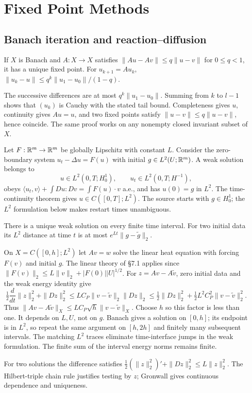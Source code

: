 \section{Fixed Point Methods}
\label{sec:9-2}
\Needspace{40mm}
\subsection{Banach iteration and reaction--diffusion}
\Needspace{50mm}
\begin{theorem}
If $X$ is Banach and $A:X\to X$ satisfies
$\|Au-Av\|\leq q\|u-v\|$ for $0\leq q<1$, it has a unique fixed point.
For $u_{k+1}=Au_k$,
$\|u_k-u\|\leq q^k\|u_1-u_0\|/(1-q)$.
\end{theorem}
\begin{expandedproof}
The successive differences are at most $q^k\|u_1-u_0\|$. Summing from
$k$ to $l-1$ shows that $(u_k)$ is Cauchy with the stated tail bound.
Completeness gives $u$, continuity gives $Au=u$, and two fixed points
satisfy $\|u-v\|\leq q\|u-v\|$, hence coincide.
The same proof works on any nonempty closed invariant subset of $X$.
\end{expandedproof}
Let $F:\mathbb{R}^m\to\mathbb{R}^m$ be globally Lipschitz with constant $L$.
Consider the zero-boundary system $u_t-\Delta u=F(u)$ with initial
$g\in L^2(U;\mathbb{R}^m)$. A weak solution belongs to
\[
 u\in L^2(0,T;H^1_0),\qquad u_t\in L^2(0,T;H^{-1}),
\]
obeys $\langle u_t,v\rangle+\int Du:Dv=\int F(u)\cdot v$ a.e.,
and has $u(0)=g$ in $L^2$. The time-continuity theorem gives
$u\in C([0,T];L^2)$. The source starts with $g\in H^1_0$;
the $L^2$ formulation below makes restart times unambiguous.
\Needspace{50mm}
\begin{theorem}
There is a unique weak solution on every finite time interval. For two
initial data its $L^2$ distance at time $t$ is at most
$e^{Lt}\|g-\tilde g\|_2$.
\end{theorem}
\begin{expandedproof}
On $X=C([0,h];L^2)$ let $Av=w$ solve the linear heat equation with
forcing $F(v)$ and initial $g$. The linear theory of \S7.1 applies since
$\|F(v)\|_2\leq L\|v\|_2+|F(0)||U|^{1/2}$.
For $z=Av-A\tilde v$, zero initial data and the weak energy identity give
\[
 \tfrac12\frac d{dt}\|z\|_2^2+\|Dz\|_2^2
 \leq L C_P\|v-\tilde v\|_2\|Dz\|_2
 \leq\tfrac12\|Dz\|_2^2+\tfrac12 L^2C_P^2\|v-\tilde v\|_2^2.
\]
Thus $\|Av-A\tilde v\|_X\leq LC_P\sqrt h\|v-\tilde v\|_X$.
Choose $h$ so this factor is less than one. It depends on $L,U$, not on
$g$. Banach gives a solution on $[0,h]$; its endpoint is in $L^2$, so
repeat the same argument on $[h,2h]$ and finitely many subsequent intervals.
The matching $L^2$ traces eliminate time-interface jumps in the weak
formulation. The finite sum of the interval energy norms remains finite.

For two solutions the difference satisfies
$\frac12(\|z\|_2^2)' +\|Dz\|_2^2\leq L\|z\|_2^2$.
The Hilbert-triple chain rule justifies testing by $z$; Gronwall gives
continuous dependence and uniqueness.
\end{expandedproof}
